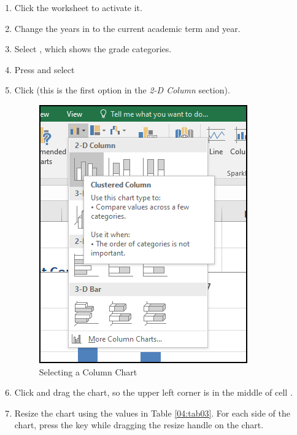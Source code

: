 \begin{enumerate}
	\item Click the  worksheet to activate it.
	\item Change the years in  to the current academic term and year.
	\item Select , which shows the grade categories.
	\item Press  and select 
	\item Click  (this is the first option in the \textit{2-D Column} section).
	
	\begin{figure}[H]
		\centering
		\includegraphics[width=\maxwidth{.65\linewidth}]{gfx/ch04_fig13}
		\caption{Selecting a Column Chart}
		\label{04:fig13}
	\end{figure}
		
	\item Click and drag the chart, so the upper left corner is in the middle of cell .
	\item Resize the chart using the values in Table \ref{04:tab03}. For each side of the chart, press the  key while dragging the resize handle on the chart.
\end{enumerate}	

